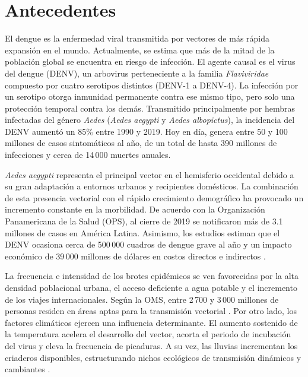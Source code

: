 \titleformat{\chapter}[display]
  {\normalfont\bfseries}{}{0pt}{\Large} %
\chapter{Antecedentes}
El dengue es la enfermedad viral transmitida por vectores de más rápida expansión en el mundo. Actualmente, se estima que más de la mitad de la población global se encuentra en riesgo de infección. El agente causal es el virus del dengue (DENV), un arbovirus perteneciente a la familia \textit{Flaviviridae} compuesto por cuatro serotipos distintos (DENV-1 a DENV-4). La infección por un serotipo otorga inmunidad permanente contra ese mismo tipo, pero solo una protección temporal contra los demás. Transmitido principalmente por hembras infectadas del género \textit{Aedes} (\textit{Aedes aegypti} y \textit{Aedes albopictus}), la incidencia del DENV aumentó un 85\% entre 1990 y 2019. Hoy en día, genera entre 50 y 100 millones de casos sintomáticos al año, de un total de hasta 390 millones de infecciones y cerca de 14\,000 muertes anuales. 

\textit{Aedes aegypti} representa el principal vector en el hemisferio occidental debido a su gran adaptación a entornos urbanos y recipientes domésticos. La combinación de esta presencia vectorial con el rápido crecimiento demográfico ha provocado un incremento constante en la morbilidad. De acuerdo con la Organización Panamericana de la Salud (OPS), al cierre de 2019 se notificaron más de 3.1 millones de casos en América Latina. Asimismo, los estudios estiman que el DENV ocasiona cerca de 500\,000 cuadros de dengue grave al año y un impacto económico de 39\,000 millones de dólares en costos directos e indirectos \cite{contreras2021aspectos}.

La frecuencia e intensidad de los brotes epidémicos se ven favorecidas por la alta densidad poblacional urbana, el acceso deficiente a agua potable y el incremento de los viajes internacionales. Según la OMS, entre 2\,700 y 3\,000 millones de personas residen en áreas aptas para la transmisión vectorial \cite{krishna2024dengue}. Por otro lado, los factores climáticos ejercen una influencia determinante. El aumento sostenido de la temperatura acelera el desarrollo del vector, acorta el periodo de incubación del virus y eleva la frecuencia de picaduras. A su vez, las lluvias incrementan los criaderos disponibles, estructurando nichos ecológicos de transmisión dinámicos y cambiantes \cite{mendoza2025spatial}. \newpage 
